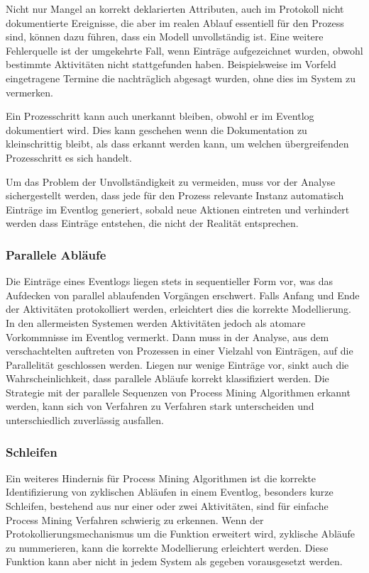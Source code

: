 Nicht nur Mangel an korrekt deklarierten Attributen, auch im Protokoll nicht dokumentierte Ereignisse, die aber im realen Ablauf essentiell für den Prozess sind, können dazu führen, dass ein Modell unvollständig ist. Eine weitere Fehlerquelle ist der umgekehrte Fall, wenn Einträge aufgezeichnet wurden, obwohl bestimmte Aktivitäten nicht stattgefunden haben. Beispielsweise im Vorfeld eingetragene Termine die nachträglich abgesagt wurden, ohne dies im System zu vermerken. 

Ein Prozesschritt kann auch unerkannt bleiben, obwohl er im Eventlog dokumentiert wird. Dies kann geschehen wenn die Dokumentation zu kleinschrittig bleibt, als dass erkannt werden kann, um welchen übergreifenden Prozesschritt es sich handelt. 

Um das Problem der Unvollständigkeit zu vermeiden, muss vor der Analyse sichergestellt werden, dass jede für den Prozess relevante Instanz automatisch Einträge im Eventlog generiert, sobald neue Aktionen eintreten und verhindert werden dass Einträge entstehen, die nicht der Realität entsprechen.

\subsubsection{Parallele Abläufe}
Die Einträge eines Eventlogs liegen stets in sequentieller Form vor, was das Aufdecken von parallel ablaufenden Vorgängen erschwert. Falls Anfang und Ende der Aktivitäten protokolliert werden, erleichtert dies die korrekte Modellierung. In den allermeisten Systemen werden Aktivitäten jedoch als atomare Vorkommnisse im Eventlog vermerkt. Dann muss in der Analyse, aus dem verschachtelten auftreten von Prozessen in einer Vielzahl von Einträgen, auf die Parallelität geschlossen werden. Liegen nur wenige Einträge vor, sinkt auch die Wahrscheinlichkeit, dass parallele Abläufe korrekt klassifiziert werden. Die Strategie mit der parallele Sequenzen von Process Mining Algorithmen erkannt werden, kann sich von Verfahren zu Verfahren stark unterscheiden und unterschiedlich zuverlässig ausfallen.

\subsubsection{Schleifen}
Ein weiteres Hindernis für Process Mining Algorithmen ist die korrekte Identifizierung von zyklischen Abläufen in einem Eventlog, besonders kurze Schleifen, bestehend aus nur einer oder zwei Aktivitäten, sind für einfache Process Mining Verfahren schwierig zu erkennen. 
Wenn der Protokollierungsmechanismus um die Funktion erweitert wird, zyklische Abläufe zu nummerieren, kann die korrekte Modellierung erleichtert werden. Diese Funktion kann aber nicht in jedem System als gegeben vorausgesetzt werden.

